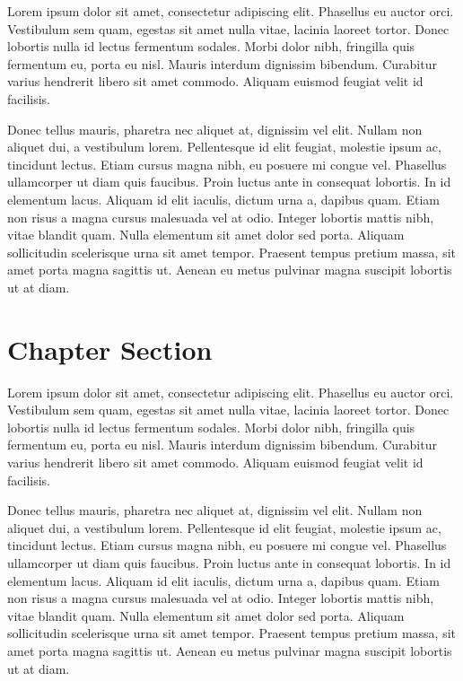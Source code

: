 Lorem ipsum dolor sit amet, consectetur adipiscing elit. Phasellus eu auctor orci. Vestibulum sem quam, egestas sit amet nulla vitae, lacinia laoreet tortor. Donec lobortis nulla id lectus fermentum sodales. Morbi dolor nibh, fringilla quis fermentum eu, porta eu nisl. Mauris interdum dignissim bibendum. Curabitur varius hendrerit libero sit amet commodo. Aliquam euismod feugiat velit id facilisis.

Donec tellus mauris, pharetra nec aliquet at, dignissim vel elit. Nullam non aliquet dui, a vestibulum lorem. Pellentesque id elit feugiat, molestie ipsum ac, tincidunt lectus. Etiam cursus magna nibh, eu posuere mi congue vel. Phasellus ullamcorper ut diam quis faucibus. Proin luctus ante in consequat lobortis. In id elementum lacus. Aliquam id elit iaculis, dictum urna a, dapibus quam. Etiam non risus a magna cursus malesuada vel at odio. Integer lobortis mattis nibh, vitae blandit quam. Nulla elementum sit amet dolor sed porta. Aliquam sollicitudin scelerisque urna sit amet tempor. Praesent tempus pretium massa, sit amet porta magna sagittis ut. Aenean eu metus pulvinar magna suscipit lobortis ut at diam.

\section{Chapter Section}
Lorem ipsum dolor sit amet, consectetur adipiscing elit. Phasellus eu auctor orci. Vestibulum sem quam, egestas sit amet nulla vitae, lacinia laoreet tortor. Donec lobortis nulla id lectus fermentum sodales. Morbi dolor nibh, fringilla quis fermentum eu, porta eu nisl. Mauris interdum dignissim bibendum. Curabitur varius hendrerit libero sit amet commodo. Aliquam euismod feugiat velit id facilisis.

Donec tellus mauris, pharetra nec aliquet at, dignissim vel elit. Nullam non aliquet dui, a vestibulum lorem. Pellentesque id elit feugiat, molestie ipsum ac, tincidunt lectus. Etiam cursus magna nibh, eu posuere mi congue vel. Phasellus ullamcorper ut diam quis faucibus. Proin luctus ante in consequat lobortis. In id elementum lacus. Aliquam id elit iaculis, dictum urna a, dapibus quam. Etiam non risus a magna cursus malesuada vel at odio. Integer lobortis mattis nibh, vitae blandit quam. Nulla elementum sit amet dolor sed porta. Aliquam sollicitudin scelerisque urna sit amet tempor. Praesent tempus pretium massa, sit amet porta magna sagittis ut. Aenean eu metus pulvinar magna suscipit lobortis ut at diam.
